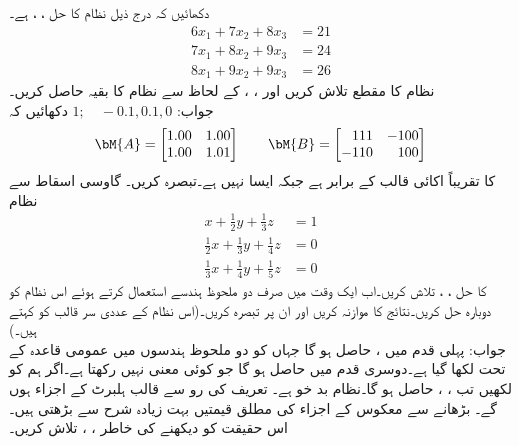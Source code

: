 \quad
دکھائیں کہ درج ذیل نظام کا حل ، ،  ہے۔
\begin{align*}
6x_1+7x_2+8x_3&=21\\
7x_1+8x_2+9x_3&=24\\
8x_1+9x_2+9x_3&=26
\end{align*}
نظام کا مقطع تلاش کریں اور ، ،  کے لحاظ سے نظام کا بقیہ حاصل کریں۔\\
جواب:\quad
$1;\quad -0.1,0.1,0$
\quad
دکھائیں کہ
\begin{align*}
\bM{A}=\begin{bmatrix}1.00&1.00\\1.00&1.01  \end{bmatrix}\quad\quad
\bM{B}=\begin{bmatrix*}[r]111&-100\\-110&100  \end{bmatrix*}
\end{align*}
کا  تقریباً اکائی قالب کے برابر ہے جبکہ  ایسا نہیں ہے۔تبصرہ کریں۔
\quad {}  \quad 
گاوسی اسقاط سے نظام
\begin{align*}
x+\tfrac{1}{2}y+\tfrac{1}{3}z&=1\\
\tfrac{1}{2}x+\tfrac{1}{3}y+\tfrac{1}{4}z&=0\\
\tfrac{1}{3}x+\tfrac{1}{4}y+\tfrac{1}{5}z&=0
\end{align*}
کا حل ، ،  تلاش کریں۔اب ایک وقت میں صرف دو ملحوظ ہندسے استعمال کرتے ہوئے اس نظام کو دوبارہ حل کریں۔نتائج کا موازنہ کریں اور ان پر تبصرہ کریں۔(اس نظام کے عددی سر قالب کو    کہتے ہیں۔)\\
جواب:\quad
پہلی قدم میں ،  حاصل ہو گا جہاں  کو دو ملحوظ ہندسوں میں عمومی قاعدہ کے تحت  لکھا گیا ہے۔دوسری قدم میں  حاصل ہو گا جو کوئی معنی نہیں رکھتا ہے۔اگر ہم  کو  لکھیں تب ، ،  حاصل ہو گا۔نظام بد خو ہے۔
\quad 
تعریف کی رو سے  قالب ہلبرٹ   کے اجزاء  ہوں گے۔ بڑھانے سے معکوس  کے اجزاء کی مطلق قیمتیں بہت زیادہ شرح سے بڑھتی ہیں۔اس حقیقت کو دیکھنے کی خاطر ، ، تلاش کریں۔

